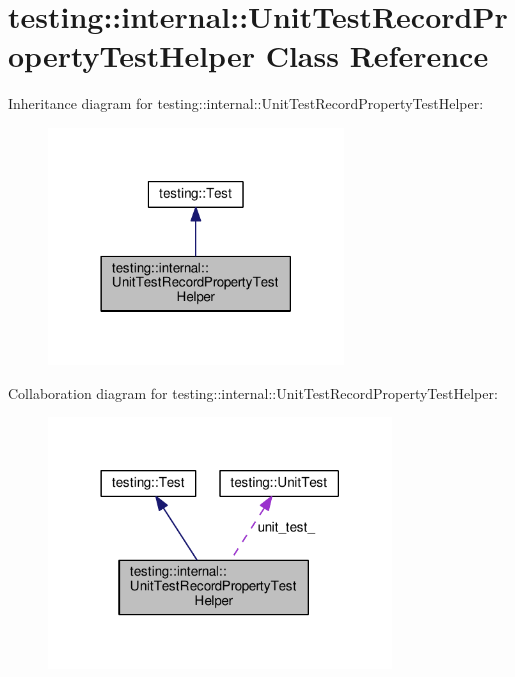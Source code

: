 \hypertarget{classtesting_1_1internal_1_1UnitTestRecordPropertyTestHelper}{}\section{testing\+:\+:internal\+:\+:Unit\+Test\+Record\+Property\+Test\+Helper Class Reference}
\label{classtesting_1_1internal_1_1UnitTestRecordPropertyTestHelper}


Inheritance diagram for testing\+:\+:internal\+:\+:Unit\+Test\+Record\+Property\+Test\+Helper\+:\nopagebreak
\begin{figure}[H]
\begin{center}
\leavevmode
\includegraphics[width=222pt]{classtesting_1_1internal_1_1UnitTestRecordPropertyTestHelper__inherit__graph}
\end{center}
\end{figure}


Collaboration diagram for testing\+:\+:internal\+:\+:Unit\+Test\+Record\+Property\+Test\+Helper\+:\nopagebreak
\begin{figure}[H]
\begin{center}
\leavevmode
\includegraphics[width=258pt]{classtesting_1_1internal_1_1UnitTestRecordPropertyTestHelper__coll__graph}
\end{center}
\end{figure}

